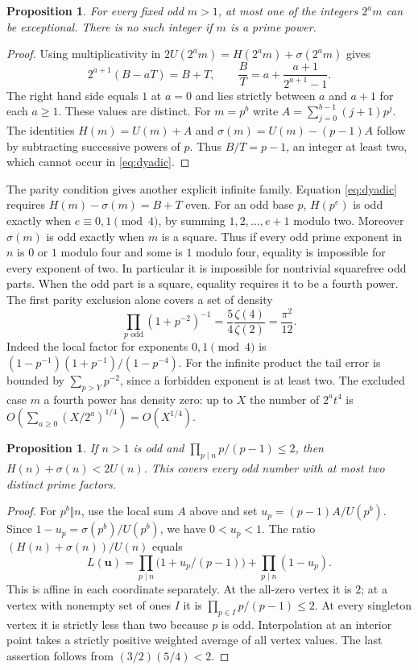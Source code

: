 \documentclass[11pt]{article}
\newtheorem{proposition}[theorem]{Proposition}
\begin{document}
\begin{proposition}
For every fixed odd $m>1$, at most one of the integers $2^am$ can
be exceptional. There is no such integer if $m$ is a prime power.
\end{proposition}
\begin{proof}
Using multiplicativity in $2U(2^am)=H(2^am)+\sigma(2^am)$ gives
\begin{equation}
 2^{a+1}(B-aT)=B+T,\qquad
 \frac{B}{T}=a+\frac{a+1}{2^{a+1}-1}.\label{eq:dyadic}
\end{equation}
The right hand side equals $1$ at $a=0$ and lies strictly between
$a$ and $a+1$ for each $a\ge1$. These values are distinct. For
$m=p^b$ write $A=\sum_{j=0}^{b-1}(j+1)p^j$. The identities
$H(m)=U(m)+A$ and $\sigma(m)=U(m)-(p-1)A$ follow by subtracting
successive powers of $p$. Thus $B/T=p-1$, an integer at least two,
which cannot occur in \eqref{eq:dyadic}.
\end{proof}

The parity condition gives another explicit infinite family. Equation
\eqref{eq:dyadic} requires $H(m)-\sigma(m)=B+T$ even.
For an odd base $p$, $H(p^e)$ is odd exactly when
$e\equiv0,1\pmod4$, by summing $1,2,\ldots,e+1$ modulo two.
Moreover $\sigma(m)$ is odd exactly when $m$ is a square.
Thus if every odd prime exponent in $n$ is $0$ or $1$ modulo four
and some is $1$ modulo four, equality is impossible for every
exponent of two. In particular it is impossible for nontrivial
squarefree odd parts. When the odd part is a square, equality requires
it to be a fourth power. The first parity exclusion alone covers a
set of density
\[
 \prod_{p\text{ odd}}(1+p^{-2})^{-1}
 =\frac54\frac{\zeta(4)}{\zeta(2)}=\frac{\pi^2}{12}.
\]
Indeed the local factor for exponents $0,1\pmod4$ is
$(1-p^{-1})(1+p^{-1})/(1-p^{-4})$. For the infinite product the
tail error is bounded by $\sum_{p>Y}p^{-2}$, since a forbidden
exponent is at least two. The excluded case $m$ a fourth power has
density zero: up to $X$ the number of $2^a t^4$ is
$O(\sum_{a\ge0}(X/2^a)^{1/4})=O(X^{1/4})$.

\begin{proposition}
If $n>1$ is odd and $\prod_{p\mid n}p/(p-1)\le2$, then
$H(n)+\sigma(n)<2U(n)$. This covers every odd number with at most
two distinct prime factors.
\end{proposition}
\begin{proof}
For $p^b\Vert n$, use the local sum $A$ above and set
$u_p=(p-1)A/U(p^b)$. Since $1-u_p=\sigma(p^b)/U(p^b)$, we have
$0<u_p<1$. The ratio $(H(n)+\sigma(n))/U(n)$ equals
\[
 L(\mathbf u)=\prod_{p\mid n}\bigl(1+u_p/(p-1)\bigr)
                       +\prod_{p\mid n}(1-u_p).
\]
This is affine in each coordinate separately. At the all-zero
vertex it is $2$; at a vertex with nonempty set of ones $I$ it is
$\prod_{p\in I}p/(p-1)\le2$. At every singleton vertex it is
strictly less than two because $p$ is odd. Interpolation at an
interior point takes a strictly positive weighted average of all
vertex values. The last assertion follows from $(3/2)(5/4)<2$.
\end{proof}
\end{document}
